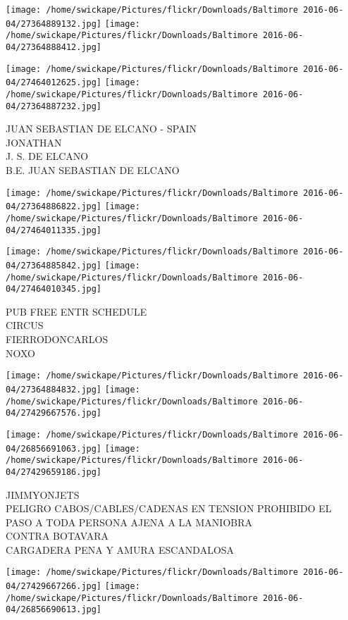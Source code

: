 \documentclass[10pt,letterpaper]{article}
\begin{document}
\texttt{[image: /home/swickape/Pictures/flickr/Downloads/Baltimore 2016-06-04/27364889132.jpg]}
\texttt{[image: /home/swickape/Pictures/flickr/Downloads/Baltimore 2016-06-04/27364888412.jpg]}

\texttt{[image: /home/swickape/Pictures/flickr/Downloads/Baltimore 2016-06-04/27464012625.jpg]}
\texttt{[image: /home/swickape/Pictures/flickr/Downloads/Baltimore 2016-06-04/27364887232.jpg]}

JUAN SEBASTIAN DE ELCANO {-} SPAIN\\
JONATHAN\\
J. S. DE ELCANO\\
B.E. JUAN SEBASTIAN DE ELCANO
\pagebreak

\texttt{[image: /home/swickape/Pictures/flickr/Downloads/Baltimore 2016-06-04/27364886822.jpg]}
\texttt{[image: /home/swickape/Pictures/flickr/Downloads/Baltimore 2016-06-04/27464011335.jpg]}

\texttt{[image: /home/swickape/Pictures/flickr/Downloads/Baltimore 2016-06-04/27364885842.jpg]}
\texttt{[image: /home/swickape/Pictures/flickr/Downloads/Baltimore 2016-06-04/27464010345.jpg]}

PUB FREE ENTR SCHEDULE\\
CIRCUS\\
FIERRODONCARLOS\\
NOXO
\pagebreak

\texttt{[image: /home/swickape/Pictures/flickr/Downloads/Baltimore 2016-06-04/27364884832.jpg]}
\texttt{[image: /home/swickape/Pictures/flickr/Downloads/Baltimore 2016-06-04/27429667576.jpg]}

\texttt{[image: /home/swickape/Pictures/flickr/Downloads/Baltimore 2016-06-04/26856691063.jpg]}
\texttt{[image: /home/swickape/Pictures/flickr/Downloads/Baltimore 2016-06-04/27429659186.jpg]}

JIMMYONJETS\\
PELIGRO CABOS/CABLES/CADENAS EN TENSION PROHIBIDO EL PASO A TODA PERSONA AJENA A LA MANIOBRA\\
CONTRA BOTAVARA\\
CARGADERA PENA Y AMURA ESCANDALOSA
\pagebreak

\texttt{[image: /home/swickape/Pictures/flickr/Downloads/Baltimore 2016-06-04/27429667266.jpg]}
\texttt{[image: /home/swickape/Pictures/flickr/Downloads/Baltimore 2016-06-04/26856690613.jpg]}
\end{document}
